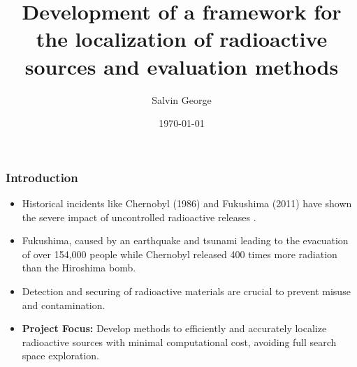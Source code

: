 \documentclass[aspectratio=169]{beamer}
\author[]{Salvin George}
\title{Development of a framework for the localization of radioactive sources and evaluation methods}
\institute[HBRS]{Hochschule Bonn-Rhein-Sieg}
\date{\today}
\begin{document}
\begin{frame}
\titlepage
\end{frame}






\begin{frame}
  \frametitle{Introduction}
  
  \begin{itemize}
    \item Historical incidents like Chernobyl (1986) and Fukushima (2011) have shown the severe impact of uncontrolled radioactive releases \cite{iaea2022itdb}.
    \item Fukushima, caused by an earthquake and tsunami leading to the evacuation of over 154,000 people \cite{WHO} while Chernobyl released 400 times more radiation than the Hiroshima bomb\cite{UNSCEAR}.
    \item Detection and securing of radioactive materials are crucial to prevent misuse and contamination.
    \item \textcolor{hbrsblue}{\textbf{Project Focus:}} Develop methods to efficiently and accurately localize radioactive sources with minimal computational cost, avoiding full search space exploration.
\end{itemize}
  
  \end{frame}
\end{document}
